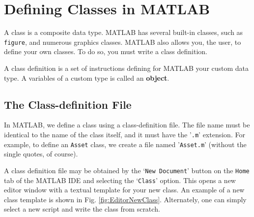 
\section{Defining Classes in MATLAB}

A class is a composite data type. MATLAB has several built-in classes, such as \texttt{figure}, and numerous graphics classes. MATLAB also allows you, the user, to define your own classes. To do so, you must write a class definition.

A class definition is a set of instructions defining for MATLAB your custom data type. A variables of a custom type is called an \textbf{object}.

\subsection{The Class-definition File}
In MATLAB, we define a class using a class-definition file. The file name must be identical to the name of the class itself, and it must have the '\texttt{.m}' extension. For example, to define an \texttt{Asset} class, we create a file named '\texttt{Asset.m}' (without the single quotes, of course).

A class definition file may be obtained by the `\texttt{New Document}' button on the \texttt{Home} tab of the MATLAB IDE and selecting the `\texttt{Class}' option. This opens a new editor window with a textual template for your new class. An example of a new class template is shown in Fig. \ref{fig:EditorNewClass}. Alternately, one can simply select a new script and write the class from scratch.

